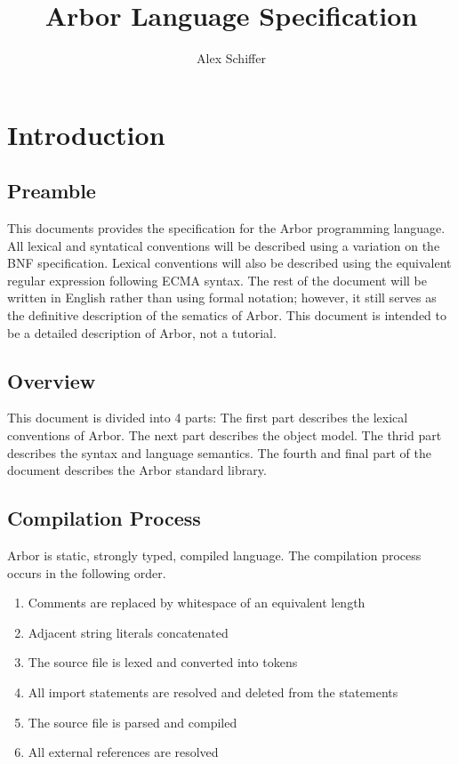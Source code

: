 \documentclass{article}
\title{Arbor Language Specification}
\author{Alex Schiffer}
\begin{document}
    \maketitle
    \newpage
    \tableofcontents
    \newpage
    \section{Introduction}
    \subsection{Preamble}
    This documents provides the specification for the Arbor programming language. All lexical and syntatical conventions will be described using a
    variation on the BNF specification. Lexical conventions will also be described using the equivalent regular expression following ECMA syntax. 
    The rest of the document will be written in English rather than using formal notation; however, it still serves as the definitive description 
    of the sematics of Arbor. This document is intended to be a detailed description of Arbor, not a tutorial. 
    \subsection{Overview}
    This document is divided into 4 parts: The first part describes the lexical conventions of Arbor. The next part describes the object model.
    The thrid part describes the syntax and language semantics. The fourth and final part of the document describes the Arbor standard library.
    \subsection{Compilation Process}
    Arbor is static, strongly typed, compiled language. The compilation process occurs in the following order. 
    \begin{enumerate}
        \item Comments are replaced by whitespace of an equivalent length
        \item Adjacent string literals concatenated
        \item The source file is lexed and converted into tokens 
        \item All import statements are resolved and deleted from the statements
        \item The source file is parsed and compiled
        \item All external references are resolved
    \end{enumerate}
\end{document}

